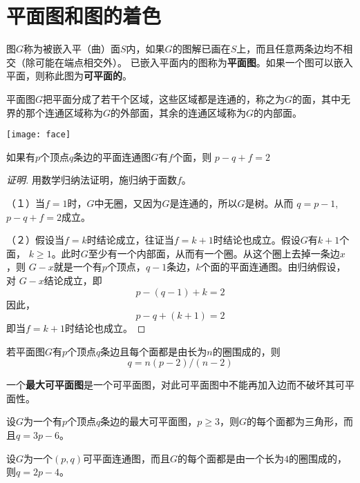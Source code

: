 \chapter{平面图和图的着色}
  \begin{Def}
    图$G$称为被嵌入平（曲）面$S$内，如果$G$的图解已画在$S$上，而且任意两条边均不相交（除可能在端点相交外）。
已嵌入平面内的图称为{\bfseries 平面图}。如果一个图可以嵌入平面，则称此图为{\bfseries 可平面的}。
\end{Def}
  \begin{Def}
    平面图$G$把平面分成了若干个区域，这些区域都是连通的，称之为$G$的面，其中无界的那个连通区域称为$G$的外部面，其余的连通区域称为$G$的内部面。
  \end{Def}
  \begin{center}
  \texttt{[image: face]}
\end{center}
\begin{Thm}[欧拉公式]
    如果有$p$个顶点$q$条边的平面连通图$G$有$f$个面，则
      $p - q + f = 2$
    \end{Thm}
    \begin{proof}[证明]
\mbox{}\par{}
    用数学归纳法证明，施归纳于面数$f$。

  （１）当$f=1$时，$G$中无圈，又因为$G$是连通的，所以$G$是树。从而
  $q=p-1$,$p-q+f=2$成立。

  （２）假设当$f=k$时结论成立，往证当$f=k+1$时结论也成立。假设$G$有$k+1$个面，
  $k\geq 1$。此时$G$至少有一个内部面，从而有一个圈。从这个圈上去掉一条边$x$，则
  $G-x$就是一个有$p$个顶点，$q-1$条边，$k$个面的平面连通图。由归纳假设，对
  $G-x$结论成立，即\[p-(q-1) + k =2\]
  因此，\[p-q+ (k+1) =2\]
  即当$f=k+1$时结论也成立。
\end{proof}
 \begin{Cor}
    若平面图$G$有$p$个顶点$q$条边且每个面都是由长为$n$的圈围成的，则
    \begin{equation*}
      q = n(p-2)/(n-2)
    \end{equation*}
  \end{Cor}
一个{\bfseries 最大可平面图}是一个可平面图，对此可平面图中不能再加入边而不破坏其可平面性。
  \begin{Cor}
    设$G$为一个有$p$个顶点$q$条边的最大可平面图，$p \geq 3$，则$G$的每个面都为三角形，而且$q=3p-6$。
  \end{Cor}
  \begin{Cor}
    设$G$为一个$(p,q)$可平面连通图，而且$G$的每个面都是由一个长为$4$的圈围成的，则$q=2p-4$。
  \end{Cor}

